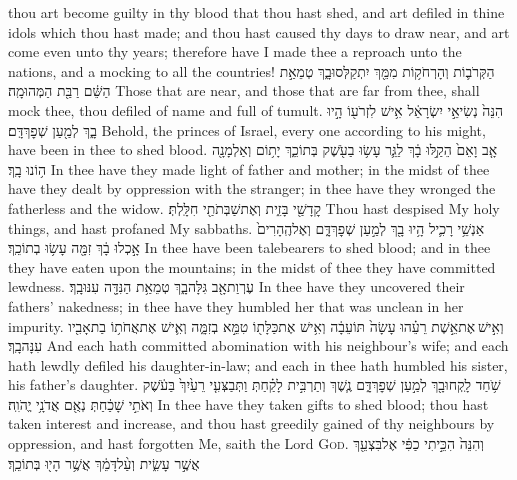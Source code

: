 {thou art become guilty in thy blood that thou hast shed, and art defiled in thine idols which thou hast made; and thou hast caused thy days to draw near, and art come even unto thy years; therefore have I made thee a reproach unto the nations, and a mocking to all the countries!}
{הַקְּרֹב֛וֹת וְהָרְחֹק֥וֹת מִמֵּ֖ךְ יִתְקַלְּסוּ\maqqaf בָ֑ךְ טְמֵאַ֣ת הַשֵּׁ֔ם רַבַּ֖ת הַמְּהוּמָֽה׃}
{Those that are near, and those that are far from thee, shall mock thee, thou defiled of name and full of tumult.}
{הִנֵּה֙ נְשִׂיאֵ֣י יִשְׂרָאֵ֔ל אִ֥ישׁ לִזְרֹע֖וֹ הָ֣יוּ בָ֑ךְ לְמַ֖עַן שְׁפׇךְ\maqqaf דָּֽם׃}
{Behold, the princes of Israel, every one according to his might, have been in thee to shed blood.}
{אָ֤ב וָאֵם֙ הֵקַ֣לּוּ בָ֔ךְ לַגֵּ֛ר עָשׂ֥וּ בַעֹ֖שֶׁק בְּתוֹכֵ֑ךְ יָת֥וֹם וְאַלְמָנָ֖ה ה֥וֹנוּ בָֽךְ׃}
{In thee have they made light of father and mother; in the midst of thee have they dealt by oppression with the stranger; in thee have they wronged the fatherless and the widow.}
{קׇדָשַׁ֖י בָּזִ֑ית וְאֶת\maqqaf שַׁבְּתֹתַ֖י חִלָּֽלְתְּ׃}
{Thou hast despised My holy things, and hast profaned My sabbaths.}
{אַנְשֵׁ֥י רָכִ֛יל הָ֥יוּ בָ֖ךְ לְמַ֣עַן שְׁפׇךְ\maqqaf דָּ֑ם וְאֶל\maqqaf הֶֽהָרִים֙ אָ֣כְלוּ בָ֔ךְ זִמָּ֖ה עָשׂ֥וּ בְתוֹכֵֽךְ׃}
{In thee have been talebearers to shed blood; and in thee they have eaten upon the mountains; in the midst of thee they have committed lewdness.}
{עֶרְוַת\maqqaf אָ֖ב גִּלָּה\maqqaf בָ֑ךְ טְמֵאַ֥ת הַנִּדָּ֖ה עִנּוּ\maqqaf בָֽךְ׃}
{In thee have they uncovered their fathers’ nakedness; in thee have they humbled her that was unclean in her impurity.}
{וְאִ֣ישׁ \legarmeh  אֶת\maqqaf אֵ֣שֶׁת רֵעֵ֗הוּ עָשָׂה֙ תּוֹעֵבָ֔ה וְאִ֥ישׁ אֶת\maqqaf כַּלָּת֖וֹ טִמֵּ֣א בְזִמָּ֑ה וְאִ֛ישׁ אֶת\maqqaf אֲחֹת֥וֹ בַת\maqqaf אָבִ֖יו עִנָּה\maqqaf בָֽךְ׃}
{And each hath committed abomination with his neighbour’s wife; and each hath lewdly defiled his daughter-in-law; and each in thee hath humbled his sister, his father’s daughter.}
{שֹׁ֥חַד לָֽקְחוּ\maqqaf בָ֖ךְ לְמַ֣עַן שְׁפׇךְ\maqqaf דָּ֑ם נֶ֧שֶׁךְ וְתַרְבִּ֣ית לָקַ֗חַתְּ וַתְּבַצְּעִ֤י רֵעַ֙יִךְ֙ בַּעֹ֔שֶׁק וְאֹתִ֣י שָׁכַ֔חַתְּ נְאֻ֖ם אֲדֹנָ֥י יֱהֹוִֽה׃}
{In thee have they taken gifts to shed blood; thou hast taken interest and increase, and thou hast greedily gained of thy neighbours by oppression, and hast forgotten Me, saith the Lord \textsc{God}.}
{וְהִנֵּה֙ הִכֵּ֣יתִי כַפִּ֔י אֶל\maqqaf בִּצְעֵ֖ךְ אֲשֶׁ֣ר עָשִׂ֑ית וְעַ֨ל\maqqaf דָּמֵ֔ךְ אֲשֶׁ֥ר הָי֖וּ בְּתוֹכֵֽךְ׃}
